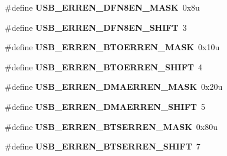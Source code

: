 \begin{DoxyCompactItemize}
\item 
\#define {\bfseries U\+S\+B\+\_\+\+E\+R\+R\+E\+N\+\_\+\+D\+F\+N8\+E\+N\+\_\+\+M\+A\+SK}~0x8u\hypertarget{group__USB__Register__Masks_ga4077d6e25312cdf05ef982907720c2f6}{}\label{group__USB__Register__Masks_ga4077d6e25312cdf05ef982907720c2f6}

\item 
\#define {\bfseries U\+S\+B\+\_\+\+E\+R\+R\+E\+N\+\_\+\+D\+F\+N8\+E\+N\+\_\+\+S\+H\+I\+FT}~3\hypertarget{group__USB__Register__Masks_ga25ff64c64f5871c1c278c5639d862ba7}{}\label{group__USB__Register__Masks_ga25ff64c64f5871c1c278c5639d862ba7}

\item 
\#define {\bfseries U\+S\+B\+\_\+\+E\+R\+R\+E\+N\+\_\+\+B\+T\+O\+E\+R\+R\+E\+N\+\_\+\+M\+A\+SK}~0x10u\hypertarget{group__USB__Register__Masks_ga3e02cf7d8b6fce5077848051a320c609}{}\label{group__USB__Register__Masks_ga3e02cf7d8b6fce5077848051a320c609}

\item 
\#define {\bfseries U\+S\+B\+\_\+\+E\+R\+R\+E\+N\+\_\+\+B\+T\+O\+E\+R\+R\+E\+N\+\_\+\+S\+H\+I\+FT}~4\hypertarget{group__USB__Register__Masks_ga6df540868c71ce6e3c7b8737a048c2aa}{}\label{group__USB__Register__Masks_ga6df540868c71ce6e3c7b8737a048c2aa}

\item 
\#define {\bfseries U\+S\+B\+\_\+\+E\+R\+R\+E\+N\+\_\+\+D\+M\+A\+E\+R\+R\+E\+N\+\_\+\+M\+A\+SK}~0x20u\hypertarget{group__USB__Register__Masks_gae1e237556956a0eb5e669aadded213b8}{}\label{group__USB__Register__Masks_gae1e237556956a0eb5e669aadded213b8}

\item 
\#define {\bfseries U\+S\+B\+\_\+\+E\+R\+R\+E\+N\+\_\+\+D\+M\+A\+E\+R\+R\+E\+N\+\_\+\+S\+H\+I\+FT}~5\hypertarget{group__USB__Register__Masks_ga8b75afb2fa004a75b39023e38db4e784}{}\label{group__USB__Register__Masks_ga8b75afb2fa004a75b39023e38db4e784}

\item 
\#define {\bfseries U\+S\+B\+\_\+\+E\+R\+R\+E\+N\+\_\+\+B\+T\+S\+E\+R\+R\+E\+N\+\_\+\+M\+A\+SK}~0x80u\hypertarget{group__USB__Register__Masks_ga806a809f05df66a7669733c599646f7f}{}\label{group__USB__Register__Masks_ga806a809f05df66a7669733c599646f7f}

\item 
\#define {\bfseries U\+S\+B\+\_\+\+E\+R\+R\+E\+N\+\_\+\+B\+T\+S\+E\+R\+R\+E\+N\+\_\+\+S\+H\+I\+FT}~7\hypertarget{group__USB__Register__Masks_ga5e760a100c4f43ecfd71952a5f393d77}{}\label{group__USB__Register__Masks_ga5e760a100c4f43ecfd71952a5f393d77}


\end{DoxyCompactItemize}
